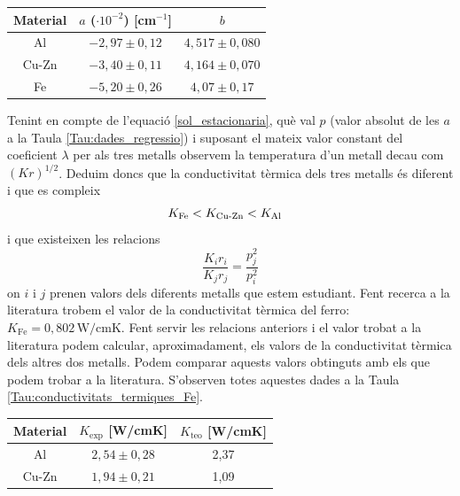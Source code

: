 \documentclass[12pt,twosides,onecolumn,openany]{article}
\newenvironment{Figura}
  {\par\medskip\noindent\minipage{\linewidth}}
  {\endminipage\par\medskip}
\begin{document}
\begin{multicols}{2}
\begin{Figura}
  \centering
  \begin{tabular}{c|c|c}
    Material & $a$ ($\cdot 10^{-2}$) [cm$^{-1}$] & $b$\\
    \hline\hline
    Al & $-2,97\pm0,12$ & $4,517\pm0,080$\\
    Cu-Zn & $-3,40\pm0,11$ & $4,164\pm0,070$ \\
    Fe & $-5,20\pm0,26$ & $4,07\pm0,17$
  \end{tabular}
  \label{Tau:dades_regressio}
\end{Figura}
Tenint en compte de l'equació \eqref{sol_estacionaria}, què val $p$ (valor absolut de les $a$ a la Taula \ref{Tau:dades_regressio}) i suposant el mateix valor constant del coeficient $\lambda$ per als tres metalls observem la temperatura d'un metall decau com $(Kr)^{1/2}$. Deduim doncs que la conductivitat tèrmica dels tres metalls és diferent i que es compleix
\begin{equation*}
  K_{\text{Fe}} < K_{\text{Cu-Zn}} < K_{\text{Al}} \hspace{3mm}
\end{equation*}
i que existeixen les relacions
\begin{equation*}
  \frac{K_ir_i}{K_jr_j} = \frac{p^2_j}{p^2_i}
\end{equation*}
on $i$ i $j$ prenen valors dels diferents metalls que estem estudiant. Fent recerca a la literatura trobem el valor de la conductivitat tèrmica del ferro: \(K_{\text{Fe}} =  0,802\, \text{W}/\text{cmK}\). Fent servir les relacions anteriors i el valor trobat a la literatura podem calcular, aproximadament, els valors de la conductivitat tèrmica dels altres dos metalls. Podem comparar aquests valors obtinguts amb els que podem trobar a la literatura. S'observen totes aquestes dades a la Taula \ref{Tau:conductivitats_termiques_Fe}.
\begin{Figura}
  \centering
  \begin{tabular}{c|c|c}
    Material & $K_{\text{exp}}$ [W/cmK] & $K_{\text{teo}}$ [W/cmK]\\
    \hline\hline
    Al & $2,54\pm0,28$ & 2,37\\
    Cu-Zn & $1,94\pm0,21$ & 1,09
  \end{tabular}

\end{Figura}
\end{multicols}
\end{document}
